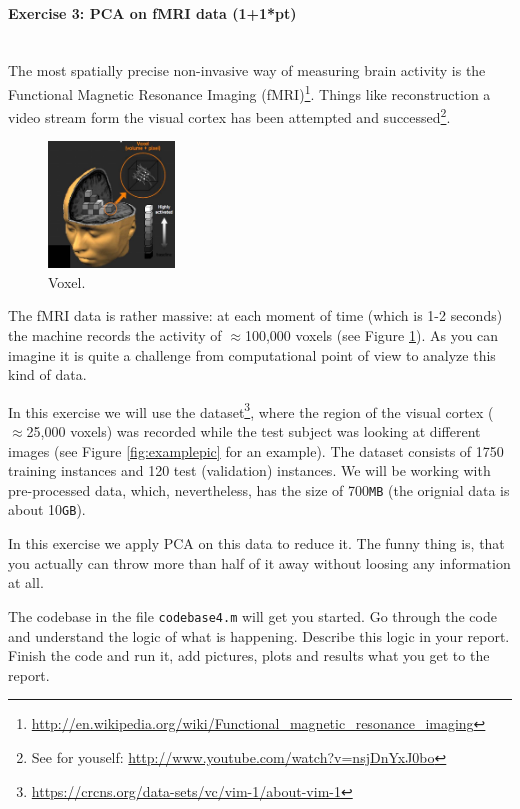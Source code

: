 \documentclass[a4paper,11pt]{article}
\newenvironment{exercise}[3]{\paragraph{Exercise #1: #2 (#3pt)}\ \\}{
\medskip}
\begin{document}
%
%
\begin{exercise}{3}{PCA on fMRI data}{1+1*}
The most spatially precise non-invasive way of measuring brain activity is the Functional Magnetic Resonance Imaging (fMRI)\footnote{\url{http://en.wikipedia.org/wiki/Functional_magnetic_resonance_imaging}}. Things like reconstruction a video stream form the visual cortex has been attempted and successed\footnote{See for youself: \url{http://www.youtube.com/watch?v=nsjDnYxJ0bo}}.

\begin{figure}
	\centering
	\vspace{-12pt}
	\includegraphics[width=0.3\textwidth]{voxel.jpg}
	\caption{Voxel.}
	\label{fig:voxel}
	\vspace{-10pt}
\end{figure}
The fMRI data is rather massive: at each moment of time (which is 1-2 seconds) the machine records the activity of $\approx$100,000 voxels (see Figure \ref{fig:voxel}). As you can imagine it is quite a challenge from computational point of view to analyze this kind of data.

In this exercise we will use the dataset\footnote{\url{https://crcns.org/data-sets/vc/vim-1/about-vim-1}}, where the region of the visual cortex ($\approx$25,000 voxels) was recorded while the test subject was looking at different images (see Figure \ref{fig:examplepic} for an example). The dataset consists of 1750 training instances and 120 test (validation) instances. We will be working with pre-processed data, which, nevertheless, has the size of 700\texttt{MB} (the orignial data is about 10\texttt{GB}).

In this exercise we apply PCA on this data to reduce it. The funny thing is, that you actually can throw more than half of it away without loosing any information at all.

The codebase in the file \texttt{codebase4.m} will get you started. Go through the code and understand the logic of what is happening. Describe this logic in your report. Finish the code and run it, add pictures, plots and results what you get to the report.


\end{exercise}
\end{document}
